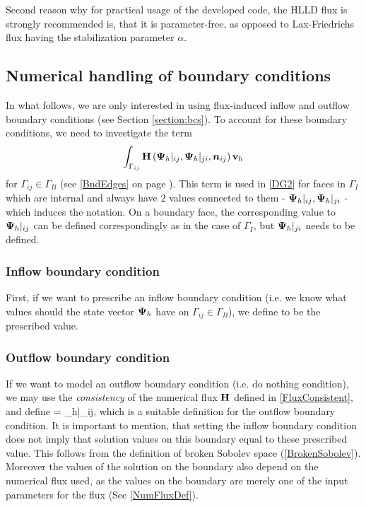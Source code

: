 Second reason why for practical usage of the developed code, the HLLD flux is strongly recommended is, that it is parameter-free, as opposed to Lax-Friedrichs flux having the stabilization parameter $\alpha$.

\subsection{Numerical handling of boundary conditions}
In what follows, we are only interested in using flux-induced inflow and outflow boundary conditions (see Section \ref{section:bcs}).
To account for these boundary conditions, we need to investigate the term
$$
\int_{\Gamma_{ij}} \mathrm{\mathbf{H}}\left({\mathrm{\mathbf{\Psi}}_h}|_{ij}, {\mathrm{\mathbf{\Psi}}_h}|_{ji}, \mbox{\boldmath $n$}_{ij}\right) \mathrm{\mathbf{v}}_h
$$
for $\Gamma_{ij} \in \Gamma_B$ (see \ref{BndEdges} on page \pageref{BndEdges}).
This term is used in \ref{DG2} for faces in $\Gamma_I$ which are internal and always have 2 values connected to them - $\mathrm{\mathbf{\Psi}}_h|_{ij}, {\mathrm{\mathbf{\Psi}}_h}|_{ji}$ - which induces the notation. On a boundary face, the corresponding value to ${\mathrm{\mathbf{\Psi}}_h}|_{ij}$ can be defined correspondingly as in the case of $\Gamma_I$, but ${\mathrm{\mathbf{\Psi}}_h}|_{ji}$ needs to be defined.
\subsubsection{Inflow boundary condition}
First, if we want to prescribe an inflow boundary condition (i.e. we know what values should the state vector $\mathrm{\mathbf{\Psi}}_h$ have on ${\Gamma_{ij}}\in\Gamma_B$), we define
\be
\label{BC1} 
\ee
to be the prescribed value.

\subsubsection{Outflow boundary condition}
If we want to model an outflow boundary condition (i.e. do nothing condition), we may use the \textit{consistency} of the numerical flux $\mathrm{\mathbf{H}}$ defined in \ref{FluxConsistent}, and define
\be
\label{BC2}  = {\mrPsi_h}|_{ij},
\ee
which is a suitable definition for the outflow boundary condition. It is important to mention, that setting the inflow boundary condition does not imply that solution values on this boundary equal to these prescribed value. This follows from the definition of broken Sobolev space (\ref{BrokenSobolev}). Moreover the values of the solution on the boundary also depend on the numerical flux used, as the values on the boundary are merely one of the input parameters for the flux (See \ref{NumFluxDef}).

